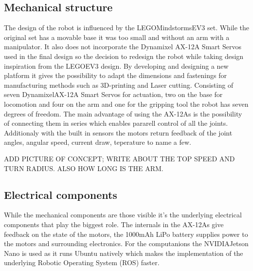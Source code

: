 
\subsection{Mechanical structure}
The design of the robot is influenced by the LEGO\textregistered Mindstorms\textregistered EV3 set. While the original set has a movable base it was too small and without an arm with a manipulator. It also does not incorporate the Dynamixel AX-12A Smart Servos used in the final design so the decision to redesign the robot while taking design inspiration from the LEGO\textregistered EV3 design. By developing and designing a new platform it gives the possibility to adapt the dimensions and fastenings for manufacturing methods such as 3D-printing and Laser cutting. 
Consisting of seven Dynamixel\textregistered AX-12A Smart Servos for actuation, two on the base for locomotion and four on the arm and one for the gripping tool the robot has seven degrees of freedom. The main advantage of using the AX-12As is the possibility of connecting them in series which enables pararell control of all the joints. Additionaly with the built in sensors the motors return feedback of the joint angles, angular speed, current draw, teperature to name a few. 

ADD PICTURE OF CONCEPT; WRITE ABOUT THE TOP SPEED AND TURN RADIUS. ALSO HOW LONG IS THE ARM.

\subsection{Electrical components}
While the mechanical components are those visible it's the underlying electrical components that play the biggest role. The internals in the AX-12As give feedback on the state of the motors, the 1000mAh LiPo battery supplies power to the motors and surrounding electronics. For the computanions the NVIDIA\textregistered Jetson Nano is used as it runs Ubuntu natively which makes the implementation of the underlying Robotic Operating System (ROS) \cite{ros} faster.  




